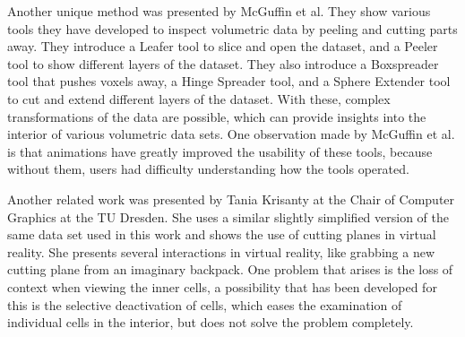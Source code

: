 Another unique method was presented by McGuffin et al.\cite{McGuffin}
They show various tools they have developed to inspect volumetric data by peeling and cutting parts away.
They introduce a Leafer tool to slice and open the dataset, and a Peeler tool to show different layers of the dataset. They also introduce a Boxspreader tool that pushes voxels away, a Hinge Spreader tool, and a Sphere Extender tool to cut and extend different layers of the dataset.
With these, complex transformations of the data are possible, which can provide insights into the interior of various volumetric data sets.
One observation made by McGuffin et al. is that animations have greatly improved the usability of these tools, because without them, users had difficulty understanding how the tools operated. 

Another related work was presented by Tania Krisanty at the Chair of Computer Graphics at the TU Dresden. She uses a similar slightly simplified version of the same data set used in this work and shows the use of cutting planes in virtual reality.\cite{krisanty_2022}
She presents several interactions in virtual reality, like grabbing a new cutting plane from an imaginary backpack. 
One problem that arises is the loss of context when viewing the inner cells, a possibility that has been developed for this is the selective deactivation of cells, which eases the examination of individual cells in the interior, but does not solve the problem completely.

